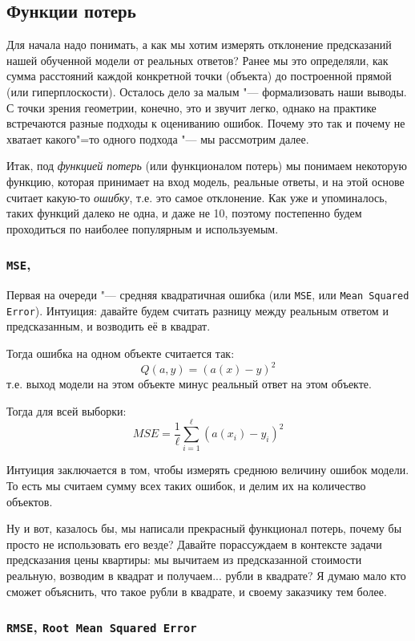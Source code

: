 \subsection*{Функции потерь}
Для начала надо понимать, а как мы хотим измерять отклонение предсказаний
нашей обученной модели от реальных ответов? Ранее мы это определяли, как
сумма расстояний каждой конкретной точки (объекта) до построенной прямой
(или гиперплоскости). Осталось дело за малым "--- формализовать 
наши выводы. С точки зрения геометрии, конечно, это и звучит легко, 
однако на практике встречаются разные подходы к оцениванию ошибок.
Почему это так и почему не хватает какого"=то одного подхода "---
мы рассмотрим далее.

Итак, под \textit{функцией потерь} (или функционалом потерь) мы понимаем
некоторую функцию, которая принимает на вход модель, реальные ответы, и 
на этой основе считает какую-то \textit{ошибку}, т.е. это самое 
отклонение. Как уже и упоминалось, таких функций далеко не одна, и даже 
не 10, поэтому постепенно будем проходиться по наиболее популярным и 
используемым.

\subsubsection*{\texttt{MSE}, }

Первая на очереди "--- средняя квадратичная ошибка (или \texttt{MSE},
или \texttt{Mean Squared Error}). Интуиция: давайте будем считать разницу
между реальным ответом и предсказанным, и возводить её в квадрат.

Тогда ошибка на одном объекте считается так:
\[
Q(a, y) = (a(x) - y)^2
\] 
т.е. выход модели на этом объекте минус реальный ответ на этом объекте.

Тогда для всей выборки:
\[
MSE = \frac{1}{\ell}\sum_{i=1}^\ell (a(x_i) - y_i)^2
\]

Интуиция заключается в том, чтобы измерять среднюю величину ошибок
модели. То есть мы считаем сумму всех таких ошибок, и делим их на 
количество объектов.

Ну и вот, казалось бы, мы написали прекрасный функционал потерь, почему
бы просто не использовать его везде? Давайте порассуждаем в контексте 
задачи предсказания цены квартиры: мы вычитаем из предсказанной стоимости
реальную, возводим в квадрат и получаем... рубли в квадрате? Я думаю
мало кто сможет объяснить, что такое рубли в квадрате, и своему заказчику
тем более.

\subsubsection*{\texttt{RMSE}, \texttt{Root Mean Squared Error}}

